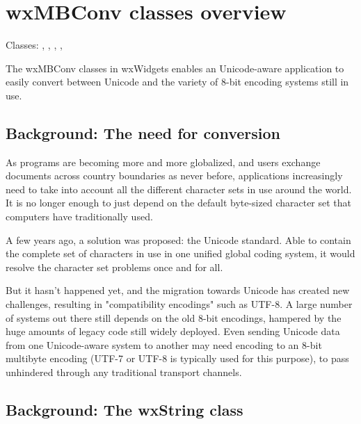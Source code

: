 
\section{wxMBConv classes overview}\label{mbconvclasses}

Classes: , , 
, , 

The wxMBConv classes in wxWidgets enables an Unicode-aware application to
easily convert between Unicode and the variety of 8-bit encoding systems still
in use.

\subsection{Background: The need for conversion}

As programs are becoming more and more globalized, and users exchange documents
across country boundaries as never before, applications increasingly need to
take into account all the different character sets in use around the world. It
is no longer enough to just depend on the default byte-sized character set that
computers have traditionally used.

A few years ago, a solution was proposed: the Unicode standard. Able to contain
the complete set of characters in use in one unified global coding system,
it would resolve the character set problems once and for all.

But it hasn't happened yet, and the migration towards Unicode has created new
challenges, resulting in "compatibility encodings" such as UTF-8. A large
number of systems out there still depends on the old 8-bit encodings, hampered
by the huge amounts of legacy code still widely deployed. Even sending
Unicode data from one Unicode-aware system to another may need encoding to an
8-bit multibyte encoding (UTF-7 or UTF-8 is typically used for this purpose), to
pass unhindered through any traditional transport channels.

\subsection{Background: The wxString class}

